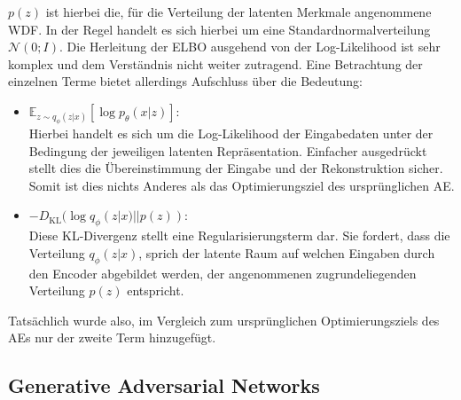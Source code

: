 $p(z)$ ist hierbei die, für die Verteilung der latenten Merkmale angenommene \ac{WDF}. In der Regel handelt es sich hierbei um eine Standardnormalverteilung $\mathcal N(0; I)$. Die Herleitung der \ac{ELBO} ausgehend von der Log-Likelihood ist sehr komplex und dem Verständnis nicht weiter zutragend. Eine Betrachtung der einzelnen Terme bietet allerdings Aufschluss über die Bedeutung:
\begin{itemize}
    \item $\mathbb E_{z \sim q_{\phi}(z|x)}
        \left [
            \log p_\theta(x|z)
        \right ]$: \\
    Hierbei handelt es sich um die Log-Likelihood der Eingabedaten unter der Bedingung der jeweiligen latenten Repräsentation. Einfacher ausgedrückt stellt dies die Übereinstimmung der Eingabe und der Rekonstruktion sicher. Somit ist dies nichts Anderes als das Optimierungsziel des ursprünglichen \ac{AE}.

    \item $-D_\text{KL} (\log q_{\phi}(z|x) || p(z))$: \\
    Diese KL-Divergenz stellt eine Regularisierungsterm dar. Sie fordert, dass die Verteilung $q_{\phi}(z|x)$, sprich der latente Raum auf welchen Eingaben durch den Encoder abgebildet werden, der angenommenen zugrundeliegenden Verteilung $p(z)$ entspricht.
\end{itemize}
Tatsächlich wurde also, im Vergleich zum ursprünglichen Optimierungsziels des \ac{AE}s nur der zweite Term hinzugefügt.


\subsection{Generative Adversarial Networks}

